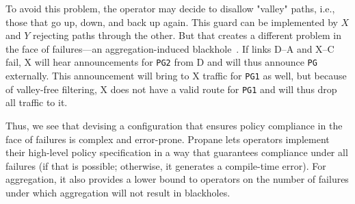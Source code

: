 \documentclass[10pt]{sigalternate052015}
\newcommand{\sysname}{{\small \sf Propane}\xspace}
\newcommand{\CD}[1]{\texttt{\small #1}}  %
\begin{document}
To avoid this problem, the operator may decide to disallow "valley" paths, i.e., those that go up, down, and back up again. This guard can be implemented by $X$ and $Y$ rejecting paths through the other. But that creates a different problem in the face of failures---an aggregation-induced blackhole~\cite{route-aggregation}. If links D--A and X--C fail, X will hear announcements for \CD{PG2} from D and will thus announce \CD{PG} externally. This announcement will bring to X traffic for \CD{PG1} as well, but because of valley-free filtering, X does not have a valid route for \CD{PG1} and will thus drop all traffic to it.

Thus, we see that devising a configuration that ensures policy compliance in the face of failures is complex and error-prone. \sysname lets operators implement their high-level policy specification in a way that guarantees compliance under all failures (if that is possible; otherwise, it generates a compile-time error). For aggregation, it also provides a lower bound to operators on the number of failures under which aggregation will not result in blackholes.
\end{document}
